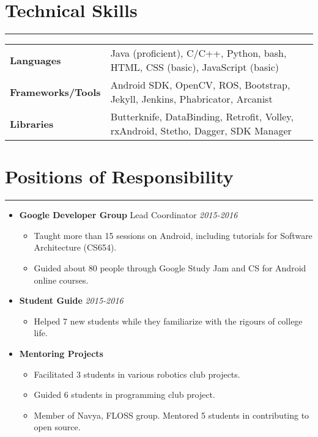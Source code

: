 \documentclass[a4paper]{article}
\begin{document}
\section*{Technical Skills}
\hrule
\vspace{3mm}
\begin{tabular}{@{}m{4.0cm}m{13cm}@{}}
	\textbf{\textrm{Languages}}        & Java (proficient), C/C++, Python, bash, HTML, CSS (basic), JavaScript (basic)      \\ 
	\textbf{\textrm{Frameworks/Tools}} & Android SDK, OpenCV, ROS, Bootstrap, Jekyll, Jenkins, Phabricator, Arcanist        \\
	\textbf{\textrm{Libraries}}        & Butterknife, DataBinding, Retrofit, Volley, rxAndroid, Stetho, Dagger, SDK Manager \\
\end{tabular}

\section*{Positions of Responsibility}
\hrule
\vspace{3mm}
\begin{itemize}
	\item
	      \textbf{Google Developer Group} Lead Coordinator
	      \hfill \textit{2015-2016}
	      \begin{itemize}
	      	\vspace{-2mm} \setlength\itemsep{-0.2em}
		\item Taught more than 15 sessions on Android, including tutorials for Software Architecture (CS654).
		\item Guided about 80 people through Google Study Jam and CS for Android online courses.
	      \end{itemize}
	\item
	      \textbf{Student Guide}
	      \hfill \textit{2015-2016}
	      \begin{itemize}
	      	\vspace{-2mm} \setlength\itemsep{-0.2em}
		\item Helped 7 new students while they familiarize with the rigours of college life.
	      \end{itemize}
	\item
	      \textbf{Mentoring Projects}
	      \begin{itemize}
	      	\vspace{-2mm} \setlength\itemsep{-0.2em}
	      	\item Facilitated 3 students in various robotics club projects.
	      	\item Guided 6 students in programming club project.
	      	\item Member of Navya, FLOSS group. Mentored 5 students in contributing to open source.
	      \end{itemize}
\end{itemize}
\end{document}
